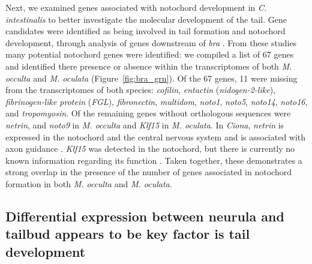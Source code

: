 Next, we examined genes associated with notochord development in \textit{C. intestinalis} to better investigate the molecular development of the tail. Gene candidates were identified as being involved in tail formation and notochord development, through analysis of genes downstream of \textit{bra} \cite{hotta_temporal_1999,hotta_characterization_2000,hotta_brachyury-downstream_2007,kugler_evolutionary_2008,kugler_evolutionary_2011}. From these studies many potential notochord genes were identified: we compiled a list of 67 genes and identified there presence or absence within the %
transcriptomes of both \textit{M. occulta} and \textit{M. oculata} (Figure~\ref{fig:bra_grn}). Of the 67 genes, 11 were missing from the transcriptomes of both species: \textit{cofilin}, \textit{entactin} (\textit{nidogen-2-like}), \textit{fibrinogen-like protein} (\textit{FGL}), \textit{fibronectin}, \textit{multidom}, \textit{noto1}, \textit{noto5}, \textit{noto14}, \textit{noto16}, and \textit{tropomyosin}. Of the remaining genes without orthologous sequences were \textit{netrin}, and \textit{noto9} in \textit{M. occulta} and \textit{Klf15} in \textit{M. oculata}. In \textit{Ciona}, \textit{netrin} is expressed in the notochord and the central nervous system and is associated with axon guidance \cite{hotta_characterization_2000}. \textit{Klf15} was detected in the notochord, but there is currently no known information regarding its function \cite{passamaneck_direct_2009}. Taken together, these demonstrates a strong overlap in the presence of the number of genes associated in notochord formation in both \textit{M. occulta} and \textit{M. oculata}.

\subsection{Differential expression between neurula and tailbud appears to be key factor is tail development} 

